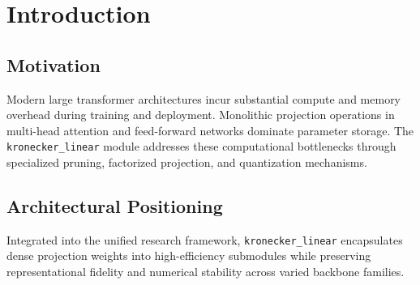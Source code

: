 \section{Introduction}

\subsection{Motivation}
Modern large transformer architectures incur substantial compute and memory overhead during training and deployment. Monolithic projection operations in multi-head attention and feed-forward networks dominate parameter storage. The \texttt{kronecker_linear} module addresses these computational bottlenecks through specialized pruning, factorized projection, and quantization mechanisms.

\subsection{Architectural Positioning}
Integrated into the unified research framework, \texttt{kronecker_linear} encapsulates dense projection weights into high-efficiency submodules while preserving representational fidelity and numerical stability across varied backbone families.
